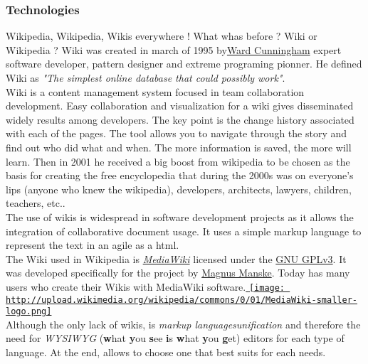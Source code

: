 \subsubsection{ Technologies} Wikipedia, Wikipedia, Wikis everywhere ! What whas before ? Wiki or Wikipedia ? Wiki was created in march of 1995 by\nolinebreak\href{http://c2.com/~ward/}{Ward Cunningham} expert software developer, pattern designer and extreme programing pionner. He defined Wiki as \textit{"The simplest online database that could possibly work"}.
\\ Wiki is a content management system focused in team collaboration development. Easy collaboration and visualization for a wiki gives disseminated widely results among developers. The key point is the change history associated with each of the pages. The tool allows you to navigate through the story and find out who did what and when. The more information is saved, the more will learn. Then in 2001 he received a big boost from wikipedia to be chosen as the basis for creating the free encyclopedia that during the 2000s was on everyone's lips (anyone who knew the wikipedia), developers, architects, lawyers, children, teachers, etc..
\\ The use of wikis is widespread in software development projects as it allows the integration of collaborative document usage. It uses a simple markup language to represent the text in an agile as a html.
\\ The Wiki used in Wikipedia is \textit{\href{http://www.mediawiki.org/wiki/MediaWiki}{MediaWiki}} licensed under the \href{http://www.gnu.org/licenses/gpl.html}{GNU GPLv3}. It was developed specifically for the project by \href{http://magnusmanske.de/}{Magnus Manske}. Today has many users who create their Wikis with MediaWiki software.\href{http://upload.wikimedia.org/wikipedia/commons/0/01/MediaWiki-smaller-logo.png}{
\texttt{[image: http://upload.wikimedia.org/wikipedia/commons/0/01/MediaWiki-smaller-logo.png]}}
\\ Although the only lack of wikis, is \textit{markup languages​​ unification} and therefore the need for \textit{WYSIWYG} (\textbf{w}hat \textbf{y}ou \textbf{s}ee \textbf{i}s \textbf{w}hat \textbf{y}ou \textbf{g}et) editors for each type of language. At the end, allows to choose one that best suits for each needs.

